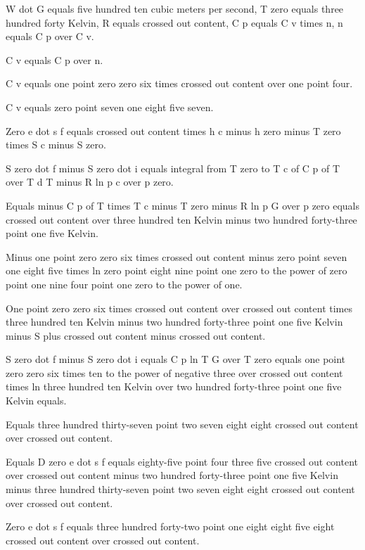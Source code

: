 W dot G equals five hundred ten cubic meters per second, T zero equals three hundred forty Kelvin, R equals crossed out content, C p equals C v times n, n equals C p over C v.

C v equals C p over n.

C v equals one point zero zero six times crossed out content over one point four.

C v equals zero point seven one eight five seven.

Zero e dot s f equals crossed out content times h c minus h zero minus T zero times S c minus S zero.

S zero dot f minus S zero dot i equals integral from T zero to T c of C p of T over T d T minus R ln p c over p zero.

Equals minus C p of T times T c minus T zero minus R ln p G over p zero equals crossed out content over three hundred ten Kelvin minus two hundred forty-three point one five Kelvin.

Minus one point zero zero six times crossed out content minus zero point seven one eight five times ln zero point eight nine point one zero to the power of zero point one nine four point one zero to the power of one.

One point zero zero six times crossed out content over crossed out content times three hundred ten Kelvin minus two hundred forty-three point one five Kelvin minus S plus crossed out content minus crossed out content.

S zero dot f minus S zero dot i equals C p ln T G over T zero equals one point zero zero six times ten to the power of negative three over crossed out content times ln three hundred ten Kelvin over two hundred forty-three point one five Kelvin equals.

Equals three hundred thirty-seven point two seven eight eight crossed out content over crossed out content.

Equals D zero e dot s f equals eighty-five point four three five crossed out content over crossed out content minus two hundred forty-three point one five Kelvin minus three hundred thirty-seven point two seven eight eight crossed out content over crossed out content.

Zero e dot s f equals three hundred forty-two point one eight eight five eight crossed out content over crossed out content.